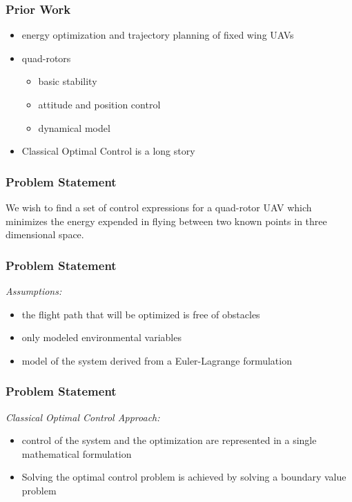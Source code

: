 \documentclass{beamer}
\begin{document}

\begin{frame}
\frametitle{Prior Work}
\begin{itemize}
\item energy optimization and trajectory planning of fixed wing UAVs
\item quad-rotors
	\begin{itemize}
		\item basic stability
		\item attitude and position control
        \item dynamical model
    \end{itemize}
\item Classical Optimal Control is a long story
\end{itemize}
\end{frame}


\begin{frame}
\frametitle{Problem Statement}

We wish to find a set of control expressions for a quad-rotor UAV which minimizes the energy expended in flying between two known points in three dimensional space.
\end{frame}

\begin{frame}
\frametitle{Problem Statement}
\textit{Assumptions:}
\begin{itemize}
\item the flight path that will be optimized is free of obstacles
\item only modeled environmental variables
\item model of the system derived from a Euler-Lagrange formulation
\end{itemize}
\end{frame}

\begin{frame}
\frametitle{Problem Statement}

\textit{Classical Optimal Control Approach:}

\begin{itemize}
	\item control of the system and the optimization are represented in a single mathematical formulation
	\item Solving the optimal control problem is achieved by solving a boundary value problem
\end{itemize}

\end{frame}
\end{document}
